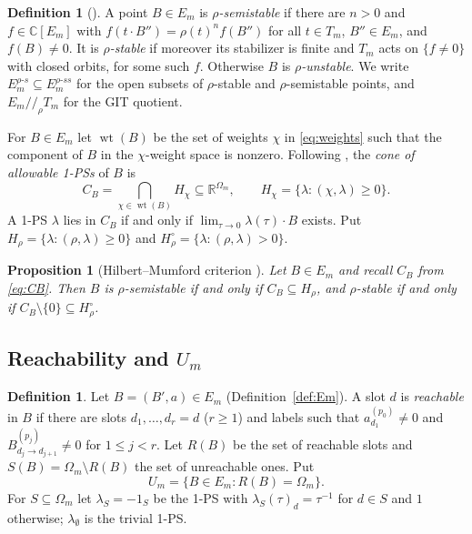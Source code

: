 \documentclass[11pt]{amsart}
\newtheorem{proposition}[theorem]{Proposition}
\theoremstyle{definition}
\newtheorem{definition}[theorem]{Definition}
\theoremstyle{remark}
\numberwithin{equation}{section}
\newcommand{\C}{\mathbb{C}}
\newcommand{\R}{\mathbb{R}}
\newcommand{\Om}{\Omega_m}
\DeclareMathOperator{\wt}{wt}
\begin{document}
\begin{definition}[{\cite[Definition~2.1]{Hos}}]\label{def:stab}
A point $B\in E_m$ is \emph{$\rho$-semistable} if there are $n>0$ and $f\in\C[E_m]$ with
$f(t\cdot B'')=\rho(t)^nf(B'')$ for all $t\in T_m$, $B''\in E_m$, and $f(B)\neq0$. It is
\emph{$\rho$-stable} if moreover its stabilizer is finite and $T_m$ acts on $\{f\neq0\}$ with closed
orbits, for some such $f$. Otherwise $B$ is \emph{$\rho$-unstable}. We write
$E_m^{\rho\text{-}s}\subseteq E_m^{\rho\text{-}ss}$ for the open subsets of $\rho$-stable and
$\rho$-semistable points, and $E_m/\!/_\rho T_m$ for the GIT quotient.
\end{definition}

For $B\in E_m$ let $\wt(B)$ be the set of weights $\chi$ in \eqref{eq:weights} such that the component
of $B$ in the $\chi$-weight space is nonzero. Following \cite[(4)]{Hos}, the \emph{cone of allowable
1-PSs} of $B$ is
\begin{equation}\label{eq:CB}
  C_B=\bigcap_{\chi\in\wt(B)}H_\chi\subseteq\R^{\Om},\qquad
  H_\chi=\{\lambda:(\chi,\lambda)\ge0\}.
\end{equation}
A 1-PS $\lambda$ lies in $C_B$ if and only if $\lim_{\tau\to0}\lambda(\tau)\cdot B$ exists. Put
$H_\rho=\{\lambda:(\rho,\lambda)\ge0\}$ and $H_\rho^{\circ}=\{\lambda:(\rho,\lambda)>0\}$.

\begin{proposition}[Hilbert--Mumford criterion {\cite[\S2.1]{Hos}}]\label{prop:HM}
Let $B\in E_m$ and recall $C_B$ from \eqref{eq:CB}. Then $B$ is $\rho$-semistable if and only if
$C_B\subseteq H_\rho$, and $\rho$-stable if and only if $C_B\setminus\{0\}\subseteq H_\rho^{\circ}$.
\end{proposition}

\subsection{Reachability and \texorpdfstring{$U_m$}{U\_m}}\label{subsec:Um}

\begin{definition}\label{def:reach}
Let $B=(B',a)\in E_m$ (Definition~\ref{def:Em}). A slot $d$ is \emph{reachable} in $B$ if there are slots
$d_1,\dots,d_r=d$ ($r\ge1$) and labels such that $a^{(p_0)}_{d_1}\neq0$ and
$B^{(p_j)}_{d_j\to d_{j+1}}\neq0$ for $1\le j<r$. Let $R(B)$ be the set of reachable slots and
$S(B)=\Om\setminus R(B)$ the set of unreachable ones. Put
\[
  U_m=\{B\in E_m: R(B)=\Om\}.
\]
For $S\subseteq\Om$ let $\lambda_S=-1_S$ be the 1-PS with $\lambda_S(\tau)_d=\tau^{-1}$ for $d\in S$ and
$1$ otherwise; $\lambda_\emptyset$ is the trivial 1-PS.
\end{definition}
\end{document}
